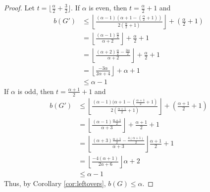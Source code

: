 \documentclass[12pt]{article}
\begin{document}
\begin{proof}
    Let $t = \lfloor \frac{\alpha}{2} + \frac{3}{2}\rfloor$.
    If $\alpha$ is even, then $t = \frac{\alpha}{2} + 1$ and
    \begin{align*}
        b(G') &\leq \left\lfloor \frac{(\alpha - 1)(\alpha + 1 - (\frac{\alpha}{2} + 1))}{2(\frac{\alpha}{2} + 1)} \right\rfloor + (\frac{\alpha}{2} + 1)\\
        &= \left\lfloor \frac{(\alpha - 1)\frac{\alpha}{2}}{\alpha + 2} \right\rfloor + \frac{\alpha}{2} + 1\\
        &= \left\lfloor \frac{(\alpha + 2)\frac{\alpha}{2} - \frac{3\alpha}{2}}{\alpha + 2} \right\rfloor + \frac{\alpha}{2} + 1\\
        &= \left\lfloor \frac{-3\alpha}{2\alpha + 4} \right\rfloor + \alpha + 1\\
        &\leq \alpha - 1
    \end{align*}
    If $\alpha$ is odd, then $t = \frac{\alpha + 1}{2} + 1$ and
    \begin{align*}
        b(G') &\leq \left\lfloor \frac{(\alpha - 1)(\alpha + 1 - (\frac{\alpha + 1}{2} + 1)}{2(\frac{\alpha + 1}{2} + 1)} \right\rfloor + (\frac{\alpha + 1}{2} + 1)\\
        &= \left\lfloor \frac{(\alpha - 1)\frac{\alpha + 1}{2}}{\alpha + 3} \right\rfloor + \frac{\alpha + 1}{2} + 1\\
        &= \left\lfloor \frac{(\alpha + 3)\frac{\alpha + 1}{2} - \frac{4(\alpha + 1)}{2}}{\alpha + 3} \right\rfloor \frac{\alpha + 1}{2} + 1\\
        &= \left\lfloor \frac{-4 (\alpha + 1)}{2\alpha + 6} \right\rfloor \alpha + 2\\
        &\leq \alpha - 1 
    \end{align*}
    Thus, by Corollary \ref{cor:leftovers}, $b(G) \leq \alpha$.
    
\end{proof}


\end{document}
